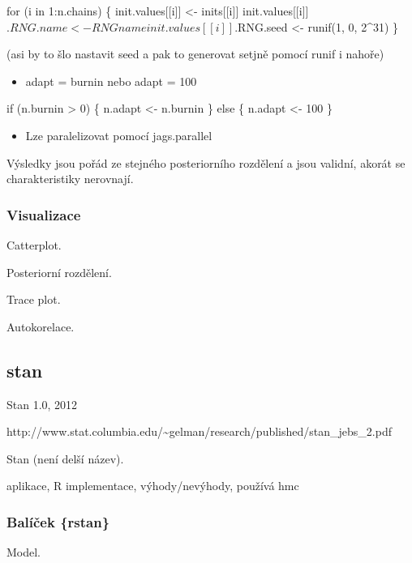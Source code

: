 \documentclass[
  11pt,
  a4paper]{report}
\providecommand{\tightlist}{%
  \setlength{\itemsep}{0pt}\setlength{\parskip}{0pt}}\usepackage{longtable,booktabs,array}
\begin{document}
for (i in 1:n.chains) \{ init.values{[}{[}i{]}{]} \textless-
inits{[}{[}i{]}{]} init.values{[}{[}i{]}{]}\(.RNG.name <- RNGname
    init.values[[i]]\).RNG.seed \textless- runif(1, 0, 2\^{}31) \}

(asi by to šlo nastavit seed a pak to generovat setjně pomocí runif i
nahoře)

\begin{itemize}
\tightlist
\item
  adapt = burnin nebo adapt = 100
\end{itemize}

if (n.burnin \textgreater{} 0) \{ n.adapt \textless- n.burnin \} else \{
n.adapt \textless- 100 \}

\begin{itemize}
\tightlist
\item
  Lze paralelizovat pomocí jags.parallel
\end{itemize}

Výsledky jsou pořád ze stejného posteriorního rozdělení a jsou validní,
akorát se charakteristiky nerovnají.

\subsubsection{Visualizace}\label{visualizace}

Catterplot.

Posteriorní rozdělení.

Trace plot.

Autokorelace.

\subsection{stan}\label{stan}

Stan 1.0, 2012

http://www.stat.columbia.edu/\textasciitilde gelman/research/published/stan\_jebs\_2.pdf

Stan (není delší název).

aplikace, R implementace, výhody/nevýhody, používá hmc

\subsubsection{Balíček \{rstan\}}\label{baluxedux10dek-rstan}

Model.
\end{document}
